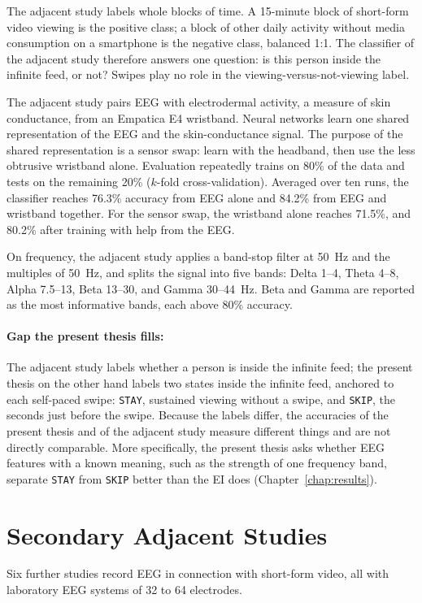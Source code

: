 \documentclass[12pt,a4paper]{report}
\begin{document}
The adjacent study labels whole blocks of time. A 15-minute block of short-form video viewing is the positive class; a block of other daily activity without media consumption on a smartphone is the negative class, balanced 1:1. The classifier of the adjacent study therefore answers one question: is this person inside the infinite feed, or not? Swipes play no role in the viewing-versus-not-viewing label.

The adjacent study pairs EEG with electrodermal activity, a measure of skin conductance, from an Empatica E4 wristband. Neural networks learn one shared representation of the EEG and the skin-conductance signal. The purpose of the shared representation is a sensor swap: learn with the headband, then use the less obtrusive wristband alone. Evaluation repeatedly trains on 80\% of the data and tests on the remaining 20\% ($k$-fold cross-validation). Averaged over ten runs, the classifier reaches 76.3\% accuracy from EEG alone and 84.2\% from EEG and wristband together. For the sensor swap, the wristband alone reaches 71.5\%, and 80.2\% after training with help from the EEG.

On frequency, the adjacent study applies a band-stop filter at 50~Hz and the multiples of 50~Hz, and splits the signal into five bands: Delta 1--4, Theta 4--8, Alpha 7.5--13, Beta 13--30, and Gamma 30--44~Hz. Beta and Gamma are reported as the most informative bands, each above 80\% accuracy.

\paragraph{Gap the present thesis fills:} The adjacent study labels whether a person is inside the infinite feed; the present thesis on the other hand labels two states inside the infinite feed, anchored to each self-paced swipe: \texttt{STAY}, sustained viewing without a swipe, and \texttt{SKIP}, the seconds just before the swipe. Because the labels differ, the accuracies of the present thesis and of the adjacent study measure different things and are not directly comparable. More specifically, the present thesis asks whether EEG features with a known meaning, such as the strength of one frequency band, separate \texttt{STAY} from \texttt{SKIP} better than the EI does (Chapter~\ref{chap:results}).

\section{Secondary Adjacent Studies}
\label{sec:secondary_adjacent_studies}
Six further studies record EEG in connection with short-form video, all with laboratory EEG systems of 32 to 64 electrodes.
\end{document}
